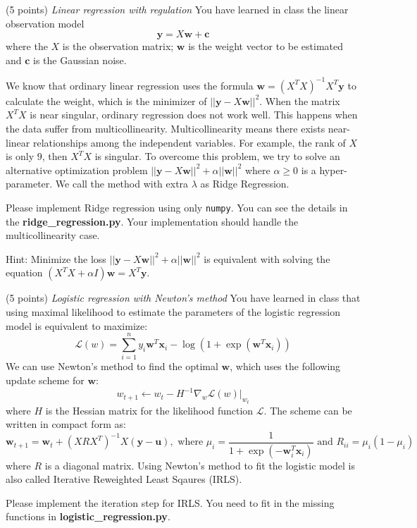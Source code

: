 \documentclass[a4paper, 12pt]{exam}
\begin{document}
\begin{questions}
\question (5 points) \emph{Linear regression with regulation} You have learned in class the linear observation model
\begin{equation*}
\bm{y} = X\bm{w} + \bm{c}
\end{equation*}
where the $X$ is the observation matrix;
$\bm{w}$ is the weight vector to be estimated and $\bm{c}$ is the Gaussian noise.

We know that ordinary linear regression uses the formula $\bm{w} = (X^TX)^{-1}X^T\bm{y}$ to calculate the weight, which is the minimizer
of $||\bm{y} - X\bm{w}||^2$.
When the matrix $X^TX$ is near singular, ordinary regression does not work well. This happens when
the data suffer from multicollinearity. Multicollinearity means there exists near-linear relationships among the independent variables.
For example, the rank of $X$ is only $9$, then $X^TX$ is singular. To overcome this problem, we try to solve an alternative optimization problem
$||\bm{y} - X\bm{w}||^2 + \alpha ||\bm{w}||^2$ where $\alpha \geq 0$ is a hyper-parameter. We call the method with extra $\lambda$ as Ridge Regression.

Please implement Ridge regression using only \texttt{numpy}. You can see the details in the \textbf{ridge\_regression.py}.
Your implementation should handle the multicollinearity case.

Hint: Minimize the loss $||\bm{y} - X\bm{w}||^2 + \alpha ||\bm{w}||^2$ is equivalent with solving the equation
$( X^T X+ \alpha I)\bm{w}  = X^T \bm{y}$.

\question (5 points) \emph{Logistic regression with Newton's method} You have learned in class that using maximal likelihood to estimate the parameters of the logistic regression model is equivalent to maximize:
\begin{equation*}
\mathcal{L}(w) = \sum_{i=1}^n y_i \bm{w}^T \bm{x}_i - \log ( 1 + \exp(\bm{w}^T \bm{x}_i))
\end{equation*}
We can use Newton's method to find the optimal $\bm{w}$, which uses the following update scheme for $\bm{w}$:
\begin{equation*}
w_{t+1} \leftarrow w_t - H^{-1} \nabla_w \mathcal{L}(w)|_{w_t}
\end{equation*}
where $H$ is the Hessian matrix for the likelihood function $\mathcal{L}$.
The scheme can be written in compact form as:
\begin{equation*}
\bm{w}_{t+1} = \bm{w}_t + (XRX^T)^{-1} X(\bm{y}-\bm{u}), \textrm{ where } \mu_i = \frac{1}{1+\exp(-\bm{w}_i^T\bm{x}_i)} \textrm{ and } R_{ii} = \mu_i ( 1 - \mu_i)
\end{equation*}
where $R$ is a diagonal matrix. Using Newton's method to fit the logistic model is also called Iterative Reweighted Least Sqaures (IRLS).

Please implement the iteration step for IRLS. You need to fit in the missing functions in \textbf{logistic\_regression.py}.

\end{questions}
\end{document}
